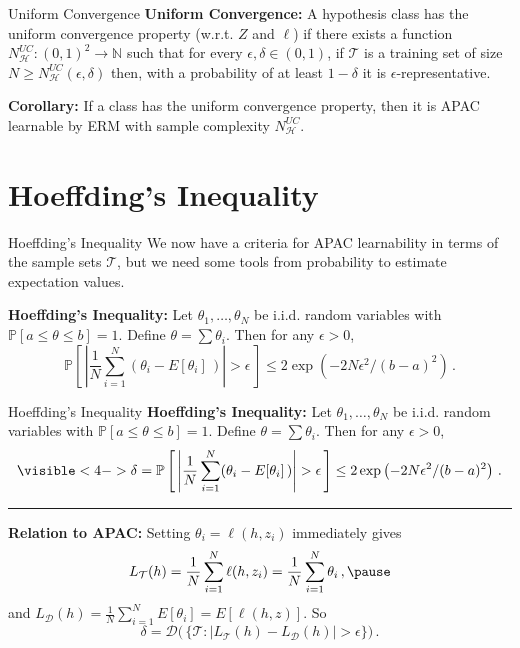\documentclass[10pt, table, handout]{beamer}
\newcommand{\cT}{\ensuremath{\mathcal{T}}}
\newcommand{\cD}{\ensuremath{\mathcal{D}}}
\newcommand{\cH}{\ensuremath{\mathcal{H}}}
\newcommand{\bP}{\ensuremath{\mathbb{P}}}
\begin{document}
\begin{frame}[fragile]{Uniform Convergence}
\textbf{Uniform Convergence:} A hypothesis class has the uniform convergence property (w.r.t. $Z$ and $\ell$) if there exists a function $N^{UC}_\cH:(0,1)^2\to\mathbb{N}$ such that for every $\epsilon,\delta \in (0,1)$, if $\cT$ is a training set of size $N\geq N^{UC}_\cH(\epsilon, \delta)$ then, with a probability of at least $1-\delta$ it is $\epsilon$-representative.\newline\pause

\textbf{Corollary:} If a class has the uniform convergence property, then it is APAC learnable by ERM with sample complexity $N^{UC}_\cH$.

\end{frame}



\section{Hoeffding's Inequality}

\begin{frame}[fragile]{Hoeffding's Inequality}
We now have a criteria for APAC learnability in terms of the sample sets $\cT$, but we need some tools from probability to estimate expectation values. \newline\pause

\textbf{Hoeffding's Inequality:} Let $\theta_1,\ldots, \theta_N$ be i.i.d. random variables with $\bP[a\leq \theta\leq b] = 1$. Define $\theta = \sum \theta_i$. Then for any $\epsilon>0$, 
$$
\bP\left[\, \left|\frac{1}{N} \sum_{i=1}^N(\theta_i - E[\theta_i]\,)\right|>\epsilon  \,\right]\leq 2\exp\left(-2N\epsilon^2/(b-a)^2\right)\,.
$$
\end{frame}



\begin{frame}[fragile]{Hoeffding's Inequality}
\textbf{Hoeffding's Inequality:} Let $\theta_1,\ldots, \theta_N$ be i.i.d. random variables with $\bP[a\leq \theta\leq b] = 1$. Define $\theta = \sum \theta_i$. Then for any $\epsilon>0$, 
$$
\visible<4->{\delta} = \bP\left[\, \left|\frac{1}{N} \sum_{i=1}^N(\theta_i - E[\theta_i]\,)\right|>\epsilon  \,\right]\leq 2\exp\left(-2N\epsilon^2/(b-a)^2\right)\,.
$$
\rule{\textwidth}{0.4pt}\pause

\textbf{Relation to APAC:} Setting $\theta_i = \ell(h,z_i)$ immediately gives 
$$
L_\cT(h) = \frac{1}{N} \sum_{i=1}^N \ell(h,z_i) =  \frac{1}{N} \sum_{i=1}^N \theta_i\,,\pause
$$ 
and $L_\cD(h) = \frac{1}{N} \sum_{i=1}^N E[\theta_i] = E[\ell(h,z)]$. \pause So 
$$
\delta = \cD\Big(\,\big\{\mathcal{T}:|L_\cT(h) - L_\cD(h)|>\epsilon\big\}\Big)\,.
$$

\end{frame}
\end{document}

